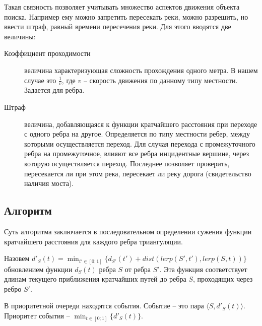 
Такая связность позволяет учитывать множество аспектов движения
объекта поиска. Например ему можно запретить пересекать реки,
можно разрешить, но ввести штраф, равный времени пересечения реки.
Для этого вводятся две величины:
\begin{description}
\item[Коэффициент проходимости] величина характеризующая сложность прохождения
одного метра. В нашем случае это $\frac{1}{v}$, где $v$ -- скорость движения
по данному типу местности. Задается для ребра.
\item[Штраф] величина, добавляющаяся к функции кратчайшего расстояния при
переходе с одного ребра на другое. Определяется по типу местности ребер,
между которыми осуществляется переход. Для случая перехода с промежуточного
ребра на промежуточное, влияют все ребра инцидентные вершине, через которую
осуществляется переход. Последнее позволяет проверить, пересекается ли при
этом река, пересекает ли реку дорога (свидетельство наличия моста).
\end{description}


\FloatBarrier

\subsection{Алгоритм}
Суть алгоритма заключается в последовательном определении сужения функции
кратчайшего расстояния для каждого ребра триангуляции.

Назовем $\displaystyle d'_S(t) = \min_{t' \in [0; 1]}\{d_{S'}(t') + dist(lerp(S', t'), lerp(S, t))\}$
обновлением функции $d_S(t)$ ребра $S$ от ребра $S'$. Эта функция
соответствует длинам текущего приближения кратчайших путей до ребра $S$,
проходящих через ребро $S'$.

В приоритетной очереди находятся события. Событие -- это пара
$\langle S, d'_S(t) \rangle$. Приоритет события -- $\displaystyle\min_{t \in [0; 1]}\{d'_S(t)\}$.

